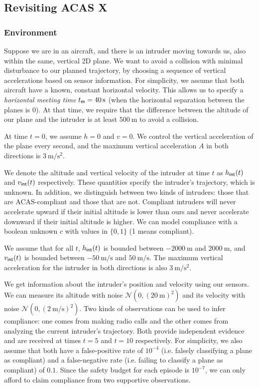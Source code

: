 

\subsection{Revisiting ACAS X}\label{ap:acas}



\subsubsection{Environment} Suppose we are in an aircraft, and there is an intruder moving towards us, also within the same, vertical 2D plane. We want to avoid a collision with minimal disturbance to our planned trajectory, by choosing a sequence of vertical accelerations based on sensor information. For simplicity, we assume that both aircraft have a known, constant horizontal velocity. This allows us to specify a \emph{horizontal meeting time} $t_\textsf{m}=\qty{40}{\second}$ (when the horizontal separation between the planes is 0). At that time, we require that the difference between the altitude of our plane and the intruder is at least $\qty{500}{\metre}$ to avoid a collision.

At time $t=0$, we assume $h=0$ and $v=0$. We control the vertical acceleration of the plane every second, and the maximum vertical acceleration $A$ in both directions is $\qty{3}{\metre\per\second\squared}$.

We denote the altitude and vertical velocity of the intruder at time $t$ as $h_\textsf{int}(t)$ and $v_\textsf{int}(t)$ respectively. These quantities specify the intruder's trajectory, which is unknown. In addition, we distinguish between two kinds of intruders: those that are ACAS-compliant and those that are not. Compliant intruders will never accelerate upward if their initial altitude is lower than ours and never accelerate downward if their initial altitude is higher. We can model compliance with a boolean unknown $c$ with values in $\{0, 1\}$ (1 means compliant).

We assume that for all $t$, $h_\textsf{int}(t)$ is bounded between $\qty{-2000}{\metre}$ and $\qty{2000}{\metre}$, and $v_\textsf{int}(t)$ is bounded between $\qty{-50}{\metre\per\second}$ and $\qty{50}{\metre\per\second}$. The maximum vertical acceleration for the intruder in both directions is also $\qty{3}{\metre\per\second\squared}$.

We get information about the intruder's position and velocity using our sensors. We can measure its altitude with noise $\mathcal{N}(0, (\qty{20}{\meter})^2)$ and its velocity with noise $\mathcal{N}(0, (\qty{2}{\meter\per\second})^2)$. Two kinds of observations can be used to infer compliance: one comes from making radio calls and the other comes from analyzing the current intruder's trajectory. Both provide independent evidence and are received at times $t=5$ and $t=10$ respectively. For simplicity, we also assume that both have a false-positive rate of $10^{-4}$ (i.e. falsely classifying a plane as compliant) and a false-negative rate (i.e. failing to classify a plane as compliant) of $0.1$. Since the safety budget for each episode is $10^{-7}$, we can only afford to claim compliance from two supportive observations.

